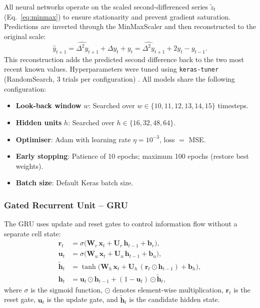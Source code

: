 \documentclass[12pt,a4paper]{article}
\begin{document}
All neural networks operate on the scaled second-differenced series $\tilde{z}_t$ (Eq.~\ref{eq:minmax}) to ensure stationarity and prevent gradient saturation. Predictions are inverted through the MinMaxScaler and then reconstructed to the original scale:
\begin{equation}
  \hat{y}_{t+1} = \widehat{\Delta^2 y}_{t+1} + \Delta y_t + y_t = \widehat{\Delta^2 y}_{t+1} + 2y_t - y_{t-1}.
  \label{eq:reconstruct}
\end{equation}
This reconstruction adds the predicted second difference back to the two most recent known values. Hyperparameters were tuned using \texttt{keras-tuner} (RandomSearch, 3 trials per configuration) \citep{omalley2019}. All models share the following configuration:
\begin{itemize}
  \item \textbf{Look-back window} $w$: Searched over $w \in \{10, 11, 12, 13, 14, 15\}$ timesteps.
  \item \textbf{Hidden units} $h$: Searched over $h \in \{16, 32, 48, 64\}$.
  \item \textbf{Optimiser}: Adam \citep{kingma2015} with learning rate $\eta = 10^{-3}$, loss $=$ MSE.
  \item \textbf{Early stopping}: Patience of 10 epochs; maximum 100 epochs (restore best weights).
  \item \textbf{Batch size}: Default Keras batch size.
\end{itemize}

\subsubsection{Gated Recurrent Unit -- GRU}

The GRU \citep{cho2014} uses update and reset gates to control information flow without a separate cell state:
\begin{align}
  \mathbf{r}_t &= \sigma\!\bigl(\mathbf{W}_r\,\mathbf{x}_t + \mathbf{U}_r\,\mathbf{h}_{t-1} + \mathbf{b}_r\bigr), \label{eq:gru_reset} \\
  \mathbf{u}_t &= \sigma\!\bigl(\mathbf{W}_u\,\mathbf{x}_t + \mathbf{U}_u\,\mathbf{h}_{t-1} + \mathbf{b}_u\bigr), \label{eq:gru_update} \\
  \tilde{\mathbf{h}}_t &= \tanh\!\bigl(\mathbf{W}_h\,\mathbf{x}_t + \mathbf{U}_h\,(\mathbf{r}_t \odot \mathbf{h}_{t-1}) + \mathbf{b}_h\bigr), \label{eq:gru_candidate} \\
  \mathbf{h}_t &= \mathbf{u}_t \odot \mathbf{h}_{t-1} + (1 - \mathbf{u}_t) \odot \tilde{\mathbf{h}}_t, \label{eq:gru_output}
\end{align}
where $\sigma$ is the sigmoid function, $\odot$ denotes element-wise multiplication, $\mathbf{r}_t$ is the reset gate, $\mathbf{u}_t$ is the update gate, and $\tilde{\mathbf{h}}_t$ is the candidate hidden state.
\end{document}
